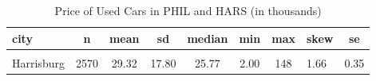 \documentclass[
]{article}
\begin{document}
\begin{longtable}[t]{lcccccclc}
\caption{\label{tab:unnamed-chunk-11}Price of Used Cars in PHIL and HARS (in thousands)}\\
\toprule
city & n & mean & sd & median & min & max & skew & se\\
\midrule
\cellcolor[HTML]{E0EEEE}{Philadelphia} & \cellcolor[HTML]{E0EEEE}{2621} & \cellcolor[HTML]{E0EEEE}{28.26} & \cellcolor[HTML]{E0EEEE}{16.79} & \cellcolor[HTML]{E0EEEE}{25.00} & \cellcolor[HTML]{E0EEEE}{1.79} & \cellcolor[HTML]{E0EEEE}{148} & \cellcolor[HTML]{E0EEEE}{1.39} & \cellcolor[HTML]{E0EEEE}{0.33}\\
Harrisburg & 2570 & 29.32 & 17.80 & 25.77 & 2.00 & 148 & 1.66 & 0.35\\
\bottomrule
\end{longtable}
\endgroup{}
\end{document}
